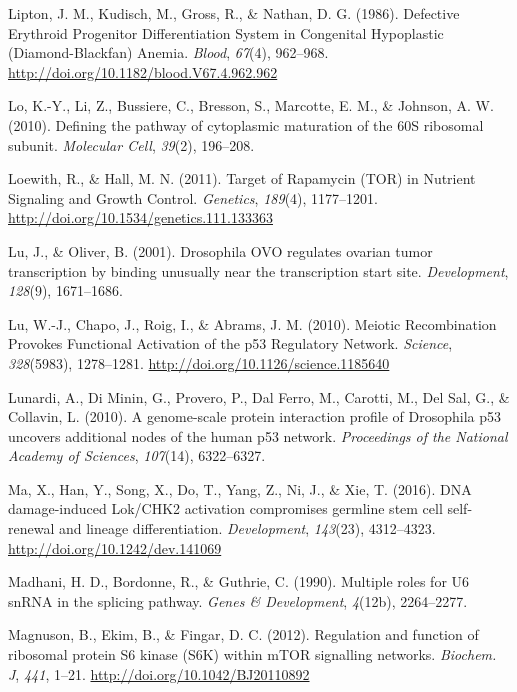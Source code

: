 \documentclass[12pt,twoside]{reedthesis}
\newlength{\cslhangindent}
\newenvironment{cslreferences}%
  {\setlength{\parindent}{0pt}%
  \everypar{\setlength{\hangindent}{\cslhangindent}}\ignorespaces}%
  {\par}
\begin{document}
\begin{cslreferences}
\leavevmode\hypertarget{ref-liptonDefectiveErythroidProgenitor1986}{}%
Lipton, J. M., Kudisch, M., Gross, R., \& Nathan, D. G. (1986). Defective Erythroid Progenitor Differentiation System in Congenital Hypoplastic (Diamond-Blackfan) Anemia. \emph{Blood}, \emph{67}(4), 962--968. \url{http://doi.org/10.1182/blood.V67.4.962.962}

\leavevmode\hypertarget{ref-Lo2010a}{}%
Lo, K.-Y., Li, Z., Bussiere, C., Bresson, S., Marcotte, E. M., \& Johnson, A. W. (2010). Defining the pathway of cytoplasmic maturation of the 60S ribosomal subunit. \emph{Molecular Cell}, \emph{39}(2), 196--208.

\leavevmode\hypertarget{ref-loewithTargetRapamycinTOR2011}{}%
Loewith, R., \& Hall, M. N. (2011). Target of Rapamycin (TOR) in Nutrient Signaling and Growth Control. \emph{Genetics}, \emph{189}(4), 1177--1201. \url{http://doi.org/10.1534/genetics.111.133363}

\leavevmode\hypertarget{ref-Lu2001}{}%
Lu, J., \& Oliver, B. (2001). Drosophila OVO regulates ovarian tumor transcription by binding unusually near the transcription start site. \emph{Development}, \emph{128}(9), 1671--1686.

\leavevmode\hypertarget{ref-luMeioticRecombinationProvokes2010}{}%
Lu, W.-J., Chapo, J., Roig, I., \& Abrams, J. M. (2010). Meiotic Recombination Provokes Functional Activation of the p53 Regulatory Network. \emph{Science}, \emph{328}(5983), 1278--1281. \url{http://doi.org/10.1126/science.1185640}

\leavevmode\hypertarget{ref-Lunardi2010a}{}%
Lunardi, A., Di Minin, G., Provero, P., Dal Ferro, M., Carotti, M., Del Sal, G., \& Collavin, L. (2010). A genome-scale protein interaction profile of Drosophila p53 uncovers additional nodes of the human p53 network. \emph{Proceedings of the National Academy of Sciences}, \emph{107}(14), 6322--6327.

\leavevmode\hypertarget{ref-maDNADamageinducedLok2016}{}%
Ma, X., Han, Y., Song, X., Do, T., Yang, Z., Ni, J., \& Xie, T. (2016). DNA damage-induced Lok/CHK2 activation compromises germline stem cell self-renewal and lineage differentiation. \emph{Development}, \emph{143}(23), 4312--4323. \url{http://doi.org/10.1242/dev.141069}

\leavevmode\hypertarget{ref-Madhani1990}{}%
Madhani, H. D., Bordonne, R., \& Guthrie, C. (1990). Multiple roles for U6 snRNA in the splicing pathway. \emph{Genes \& Development}, \emph{4}(12b), 2264--2277.

\leavevmode\hypertarget{ref-Magnuson2012c}{}%
Magnuson, B., Ekim, B., \& Fingar, D. C. (2012). Regulation and function of ribosomal protein S6 kinase (S6K) within mTOR signalling networks. \emph{Biochem. J}, \emph{441}, 1--21. \url{http://doi.org/10.1042/BJ20110892}


\end{cslreferences}
\end{document}
